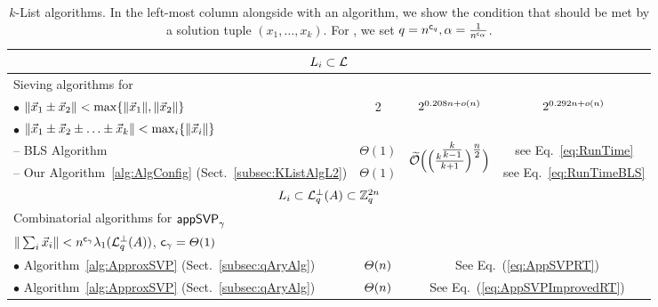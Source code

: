 \begin{table}[h]
{\begin{tabular}{|l | c | c | c |}
			\multicolumn{4}{|c|}{$L_i \subset \mathcal{L}$} \\ \hline 
			Sieving algorithms for \SVP &  & & \\ 
			\hspace{3pt} $\bullet$ $\| \vec x_1 \pm \vec x_2 \| < \max\{ \| \vec x_1 \|, \| \vec x_2 \| \}$ \cite{SODA:BDGL16} & 2 & $2^{0.208n + o(n)}$ & $2^{0.292n + o(n)}$ \\
			\hspace{3pt} $\bullet$ $\| \vec x_1 \pm \vec x_2 \pm \ldots \pm \vec x_k \| < \max_i\{ \| \vec x_i \| \}$ & & & \\ 
			\hspace{15pt} -- BLS Algorithm \cite{BLS16} & $\Theta(1)$ & \multirow{2}{*}{$\widetilde{\mathcal{O}} \Bigl( \Bigl( \frac{k^{\tfrac{k}{k-1}}}{k+1} \Bigr)^{\tfrac{n}{2}} \Bigr)$} & see Eq.~\eqref{eq:RunTime} \\
			\hspace{15pt} -- Our Algorithm~\ref{alg:AlgConfig} (Sect.~\ref{subsec:KListAlgL2}) & $\Theta(1)$ &  & see Eq.~\eqref{eq:RunTimeBLS} \\ \hline
			\multicolumn{4}{|c|}{$L_i \subset \mathcal{L}_q^{\perp}(A) \subset {{\mathbb Z}}_q^{2n}$} \\ \hline
			Combinatorial algorithms for $\textsf{appSVP}_{\gamma}$ &  & \multicolumn{2}{c|}{} \\ 
			\hspace{3pt} $\| \sum_i \vec x_i \| < n^{\mathsf{c}_{\gamma}} \lambda_1(\mathcal{L}_q^{\perp}(A))$, $\mathsf{c}_{\gamma}=\varTheta(1)$ &  &  \multicolumn{2}{c|}{} \\
			\hspace{3pt} $\bullet$ Algorithm~\ref{alg:ApproxSVP} (Sect.~\ref{subsec:qAryAlg}) & $\varTheta(n)$ & \multicolumn{2}{c|}{See Eq.~(\ref{eq:AppSVPRT})} \\
			\hspace{3pt} $\bullet$ Algorithm~\ref{alg:ApproxSVP} (Sect.~\ref{subsec:qAryAlg}) & $\varTheta(n)$ & \multicolumn{2}{c|}{See Eq.~(\ref{eq:AppSVPImprovedRT})} \\
			\hline
	\end{tabular}
	}
	\caption[$k$-List algorithms]{$k$-List algorithms. In the left-most column alongside with an algorithm, we show the condition that should be met by a solution tuple $(x_1, \ldots, x_k)$. For \LWE, we set $q = n^{\mathsf{c}_q}, \alpha = \frac{1}{n^{\mathsf{c}_{\alpha}}}$.
	\label{table:kListAlgs}}
\end{table}

\clearpage



\clearpage

